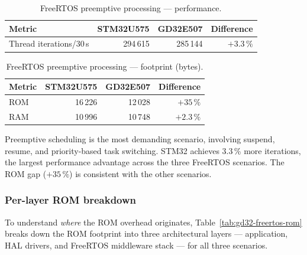 \begin{table}[H]
  \centering
  \caption{FreeRTOS preemptive processing --- performance.}
  \label{tab:gd32-freertos-preemptive-perf}
  \begin{tabular}{l r r r}
    \toprule
    \textbf{Metric} & \textbf{STM32U575} & \textbf{GD32E507} & \textbf{Difference} \\
    \midrule
    Thread iterations/30\,s & 294\,615 & 285\,144 & $+3.3\,\%$ \\
    \bottomrule
  \end{tabular}
\end{table}

\begin{table}[H]
  \centering
  \caption{FreeRTOS preemptive processing --- footprint (bytes).}
  \label{tab:gd32-freertos-preemptive-fp}
  \begin{tabular}{l r r r}
    \toprule
    \textbf{Metric} & \textbf{STM32U575} & \textbf{GD32E507} & \textbf{Difference} \\
    \midrule
    ROM & 16\,226 & 12\,028 & $+35\,\%$ \\
    RAM & 10\,996 & 10\,748 & $+2.3\,\%$ \\
    \bottomrule
  \end{tabular}
\end{table}

Preemptive scheduling is the most demanding scenario, involving suspend, resume, and
priority-based task switching. STM32 achieves 3.3\,\% more iterations, the largest
performance advantage across the three FreeRTOS scenarios. The ROM gap ($+35\,\%$) is
consistent with the other scenarios.

\subsubsection{Per-layer ROM breakdown}
\label{sec:gd32-freertos-rom-breakdown}

To understand \emph{where} the ROM overhead originates, Table~\ref{tab:gd32-freertos-rom}
breaks down the ROM footprint into three architectural layers --- application, HAL drivers,
and FreeRTOS middleware stack --- for all three scenarios.

